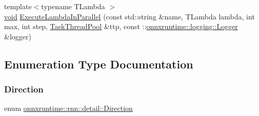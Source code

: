 \begin{DoxyCompactItemize}
\item 
{\footnotesize template$<$typename T\+Lambda $>$ }\\\mbox{\hyperlink{mlasi_8h_a88f941d423cb2a819b70a1358982b1a6}{void}} \mbox{\hyperlink{namespaceonnxruntime_1_1rnn_1_1detail_acd48e2c1247f45a983b648dc0d973725}{Execute\+Lambda\+In\+Parallel}} (const std\+::string \&name, T\+Lambda lambda, int max, int step, \mbox{\hyperlink{classonnxruntime_1_1TaskThreadPool}{Task\+Thread\+Pool}} \&ttp, const \+::\mbox{\hyperlink{classonnxruntime_1_1logging_1_1Logger}{onnxruntime\+::logging\+::\+Logger}} \&logger)
\end{DoxyCompactItemize}


\subsection{Enumeration Type Documentation}
\mbox{\label{namespaceonnxruntime_1_1rnn_1_1detail_a3a4cfb298df0a68436cdb8879647de1d}} 
\subsubsection{\texorpdfstring{Direction}{Direction}}
{\footnotesize\ttfamily enum \mbox{\hyperlink{namespaceonnxruntime_1_1rnn_1_1detail_a3a4cfb298df0a68436cdb8879647de1d}{onnxruntime\+::rnn\+::detail\+::\+Direction}}}

